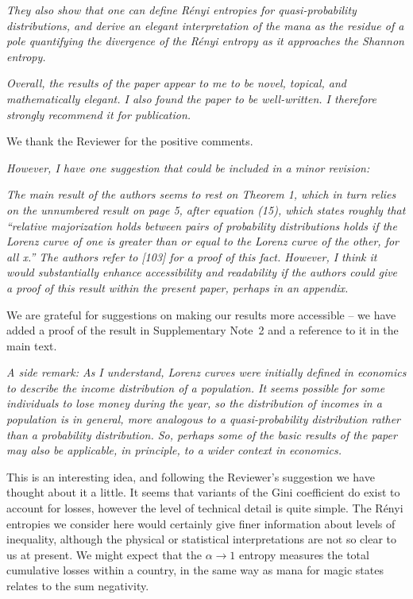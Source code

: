 \documentclass[11pt]{letter}
\begin{document}
\textit{They also show that one can define R\'{e}nyi entropies for quasi-probability distributions, and derive an elegant interpretation of the mana as the residue of a pole quantifying the divergence of the R\'{e}nyi entropy as it approaches the Shannon entropy.}

\textit{Overall, the results of the paper appear to me to be novel, topical, and mathematically elegant. I also found the paper to be well-written. I therefore strongly recommend it for publication.}

We thank the Reviewer for the positive comments.

\textit{However, I have one suggestion that could be included in a minor revision:}

\textit{The main result of the authors seems to rest on Theorem 1, which in turn relies on the unnumbered result on page 5, after equation (15), which states roughly that “relative majorization holds between pairs of probability distributions holds if the Lorenz curve of one is greater than or equal to the Lorenz curve of the other, for all x.” The authors refer to [103] for a proof of this fact. However, I think it would substantially enhance accessibility and readability if the authors could give a proof of this result within the present paper, perhaps in an appendix.}

We are grateful for suggestions on making our results more accessible -- we have added a proof of the result in Supplementary Note~2 and a reference to it in the main text.

\textit{A side remark: As I understand, Lorenz curves were initially defined in economics to describe the income distribution of a population. It seems possible for some individuals to lose money during the year, so the distribution of incomes in a population is in general, more analogous to a quasi-probability distribution rather than a probability distribution. So, perhaps some of the basic results of the paper may also be applicable, in principle, to a wider context in economics.}

This is an interesting idea,  and following the Reviewer's suggestion we have thought about it a little.  It seems that variants of the Gini coefficient do exist to account for losses,  however the level of technical detail is quite simple.  The R\'{e}nyi entropies we consider here would certainly give finer information about levels of inequality,  although the physical or statistical interpretations are not so clear to us at present.  We might expect that the $\alpha \rightarrow 1$ entropy measures the total cumulative losses within a country,  in the same way as mana for magic states relates to the sum negativity.
\end{document}
